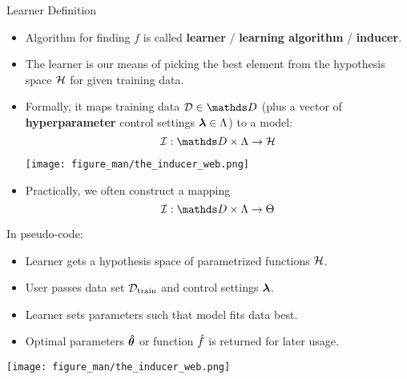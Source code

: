 \documentclass[11pt,compress,t,notes=noshow, xcolor=table]{beamer}
\begin{document}
\begin{vbframe}{Learner Definition}

\begin{itemize}

  \item Algorithm for finding  $f$ is called \textbf{learner} / \textbf{learning algorithm} /  \textbf{inducer}.
  
  \item %
  The learner is our means of picking the best element from the hypothesis space $\mathcal{H}$
  for given training data.

\item Formally, it maps training data $\D \in \allDatasets$ (plus a vector of \textbf{hyperparameter} control settings $\bm{\lambda} \in \Lambda$) to a model:
\[\ind: \preimageInducerShort \rightarrow \Hspace\]

  \begin{center}
    \texttt{[image: figure\_man/the\_inducer\_web.png]}
  \end{center}

\item Practically, we often construct a mapping 
\[\ind: \preimageInducerShort \rightarrow \Theta\]

\end{itemize}


\framebreak
  
In pseudo-code:
\begin{itemize}
  \item Learner gets a hypothesis space of parametrized functions $\mathcal{H}$.
  \item User passes data set $\mathcal{D}_{\text{train}}$ and control settings $\bm{\lambda}$.
  \item Learner sets parameters such that model 
    fits data best.
  \item Optimal parameters $\bm{\hat\theta}$ or function $\hat{f}$ is returned for later usage.

\end{itemize}

  \begin{center}
    \texttt{[image: figure\_man/the\_inducer\_web.png]}
  \end{center}


\end{vbframe}


\endlecture
\end{document}

